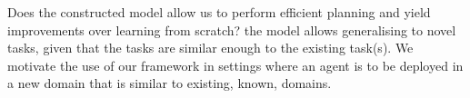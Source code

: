 Does the constructed model allow us to perform efficient planning and yield improvements over learning from scratch? 
the model allows generalising to novel tasks, given that the tasks are similar enough to the existing task(s).
We motivate the use of our framework in settings where an agent is to be deployed in a new domain that is similar to existing, known, domains.




